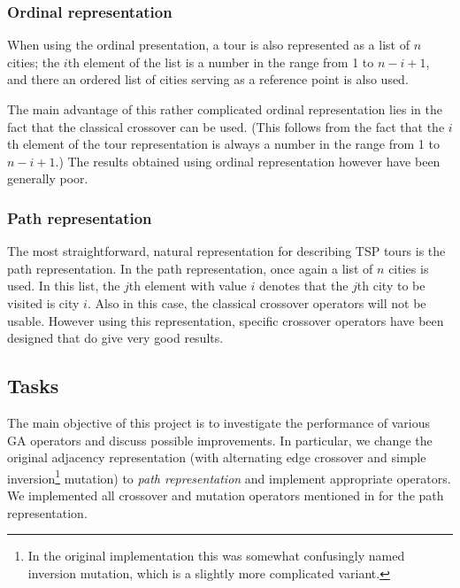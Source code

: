 \documentclass[a4paper,english,11pt,]{scrartcl}
\begin{document}

\subsubsection{Ordinal representation}
When using the ordinal presentation, a tour is also represented as a list of $n$ cities; the $i$th element of the list is a number
in the range from 1 to $n - i + 1$, and there an ordered list of cities serving as a reference point is also used. 

The main advantage of this rather complicated ordinal representation lies in the fact that the classical crossover can be used. (This follows from the fact that the $i$th element of the tour representation is always a number in the range from 1 to $n -i + 1$.) The results obtained using ordinal representation however have been generally poor. 


\subsubsection{Path representation}
The most straightforward, natural representation for describing TSP tours is the path representation. In the path representation, once again a list of $n$ cities is used. In this list, the $j$th element with value $i$ denotes that the $j$th city to be visited is city $i$. Also in this case, the classical crossover operators will not be usable. 
However using this representation, specific crossover operators have been designed that do give very good results.

\subsection{Tasks}

The main objective of this project is to investigate the performance of various GA operators and discuss possible improvements. 
In particular, we change the original adjacency representation (with alternating edge crossover and simple inversion\footnote{In the original implementation this was somewhat confusingly named inversion mutation, which is a slightly more complicated variant.} mutation) to \emph{path representation} and implement appropriate operators. We implemented all crossover and mutation operators mentioned in \cite{affenzeller2009genetic} for the path representation. 
\end{document}
